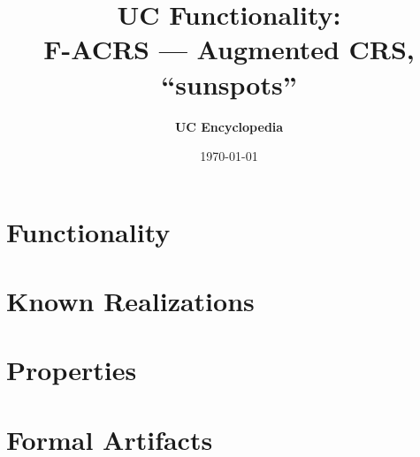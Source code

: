 \documentclass[11pt,a4paper]{article}
\title{\textbf{\Large UC Functionality:}\\[0.2em] \Large F-ACRS --- Augmented CRS, \textquotedblleft sunspots\textquotedblright}
\author{\textbf{UC Encyclopedia}}
\date{\today}
\newtheorem{functionality}{Functionality}
\begin{document}
\maketitle

\begin{abstract}
\end{abstract}

\section{Functionality}

%

\section{Known Realizations}


\section{Properties}


\section{Formal Artifacts}

\end{document}
